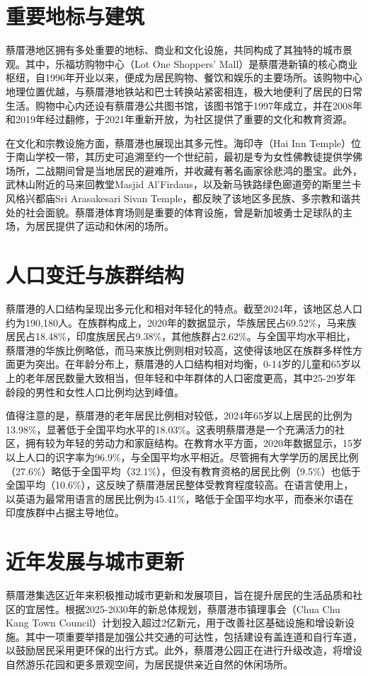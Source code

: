\documentclass[11pt,a4paper,twoside,openany]{book}
\begin{document}
\section{重要地标与建筑}
蔡厝港地区拥有多处重要的地标、商业和文化设施，共同构成了其独特的城市景观。其中，乐福坊购物中心（Lot One Shoppers' Mall）是蔡厝港新镇的核心商业枢纽，自1996年开业以来，便成为居民购物、餐饮和娱乐的主要场所。该购物中心地理位置优越，与蔡厝港地铁站和巴士转换站紧密相连，极大地便利了居民的日常生活。购物中心内还设有蔡厝港公共图书馆，该图书馆于1997年成立，并在2008年和2019年经过翻修，于2021年重新开放，为社区提供了重要的文化和教育资源。

在文化和宗教设施方面，蔡厝港也展现出其多元性。海印寺（Hai Inn Temple）位于南山学校一带，其历史可追溯至约一个世纪前，最初是专为女性佛教徒提供学佛场所，二战期间曾是当地居民的避难所，并收藏有著名画家徐悲鸿的墨宝。此外，武林山附近的马来回教堂Masjid Al’Firdaus，以及新马铁路绿色廊道旁的斯里兰卡风格兴都庙Sri Arasakesari Sivan Temple，都反映了该地区多民族、多宗教和谐共处的社会面貌。蔡厝港体育场则是重要的体育设施，曾是新加坡勇士足球队的主场，为居民提供了运动和休闲的场所。

\section{人口变迁与族群结构}
蔡厝港的人口结构呈现出多元化和相对年轻化的特点。截至2024年，该地区总人口约为190,180人。在族群构成上，2020年的数据显示，华族居民占69.52\%，马来族居民占18.48\%，印度族居民占9.38\%，其他族群占2.62\%。与全国平均水平相比，蔡厝港的华族比例略低，而马来族比例则相对较高，这使得该地区在族群多样性方面更为突出。在年龄分布上，蔡厝港的人口结构相对均衡，0-14岁的儿童和65岁以上的老年居民数量大致相当，但年轻和中年群体的人口密度更高，其中25-29岁年龄段的男性和女性人口比例均达到峰值。

值得注意的是，蔡厝港的老年居民比例相对较低，2024年65岁以上居民的比例为13.98\%，显著低于全国平均水平的18.03\%。这表明蔡厝港是一个充满活力的社区，拥有较为年轻的劳动力和家庭结构。在教育水平方面，2020年数据显示，15岁以上人口的识字率为96.9\%，与全国平均水平相近。尽管拥有大学学历的居民比例（27.6\%）略低于全国平均（32.1\%），但没有教育资格的居民比例（9.5\%）也低于全国平均（10.6\%），这反映了蔡厝港居民整体受教育程度较高。在语言使用上，以英语为最常用语言的居民比例为45.41\%，略低于全国平均水平，而泰米尔语在印度族群中占据主导地位。

\section{近年发展与城市更新}
蔡厝港集选区近年来积极推动城市更新和发展项目，旨在提升居民的生活品质和社区的宜居性。根据2025-2030年的新总体规划，蔡厝港市镇理事会（Chua Chu Kang Town Council）计划投入超过2亿新元，用于改善社区基础设施和增设新设施。其中一项重要举措是加强公共交通的可达性，包括建设有盖连道和自行车道，以鼓励居民采用更环保的出行方式。此外，蔡厝港公园正在进行升级改造，将增设自然游乐花园和更多景观空间，为居民提供亲近自然的休闲场所。
\end{document}
